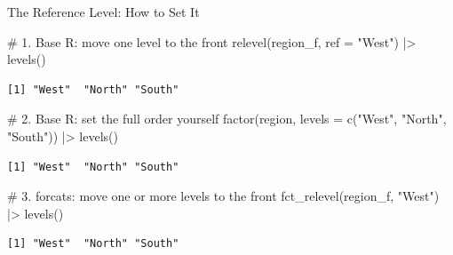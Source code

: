 \documentclass[
  ignorenonframetext,
  aspectratio=169,
]{beamer}
\newenvironment{Shaded}{\begin{snugshade}}{\end{snugshade}}
\newcommand{\AttributeTok}[1]{\textcolor[rgb]{0.40,0.45,0.13}{#1}}
\newcommand{\CommentTok}[1]{\textcolor[rgb]{0.37,0.37,0.37}{#1}}
\newcommand{\FunctionTok}[1]{\textcolor[rgb]{0.28,0.35,0.67}{#1}}
\newcommand{\NormalTok}[1]{\textcolor[rgb]{0.00,0.23,0.31}{#1}}
\newcommand{\SpecialCharTok}[1]{\textcolor[rgb]{0.37,0.37,0.37}{#1}}
\newcommand{\StringTok}[1]{\textcolor[rgb]{0.13,0.47,0.30}{#1}}
\begin{document}
\begin{frame}[fragile]{The Reference Level: How to Set It}
\protect\hypertarget{the-reference-level-how-to-set-it}{}
\begin{Shaded}
\begin{Highlighting}[]
\CommentTok{\# 1. Base R: move one level to the front}
\FunctionTok{relevel}\NormalTok{(region\_f, }\AttributeTok{ref =} \StringTok{"West"}\NormalTok{) }\SpecialCharTok{|\textgreater{}} \FunctionTok{levels}\NormalTok{()}
\end{Highlighting}
\end{Shaded}

\begin{verbatim}
[1] "West"  "North" "South"
\end{verbatim}

\begin{Shaded}
\begin{Highlighting}[]
\CommentTok{\# 2. Base R: set the full order yourself}
\FunctionTok{factor}\NormalTok{(region, }\AttributeTok{levels =} \FunctionTok{c}\NormalTok{(}\StringTok{"West"}\NormalTok{, }\StringTok{"North"}\NormalTok{, }\StringTok{"South"}\NormalTok{)) }\SpecialCharTok{|\textgreater{}} \FunctionTok{levels}\NormalTok{()}
\end{Highlighting}
\end{Shaded}

\begin{verbatim}
[1] "West"  "North" "South"
\end{verbatim}

\begin{Shaded}
\begin{Highlighting}[]
\CommentTok{\# 3. forcats: move one or more levels to the front}
\FunctionTok{fct\_relevel}\NormalTok{(region\_f, }\StringTok{"West"}\NormalTok{) }\SpecialCharTok{|\textgreater{}} \FunctionTok{levels}\NormalTok{()}
\end{Highlighting}
\end{Shaded}

\begin{verbatim}
[1] "West"  "North" "South"
\end{verbatim}
\end{frame}
\end{document}
